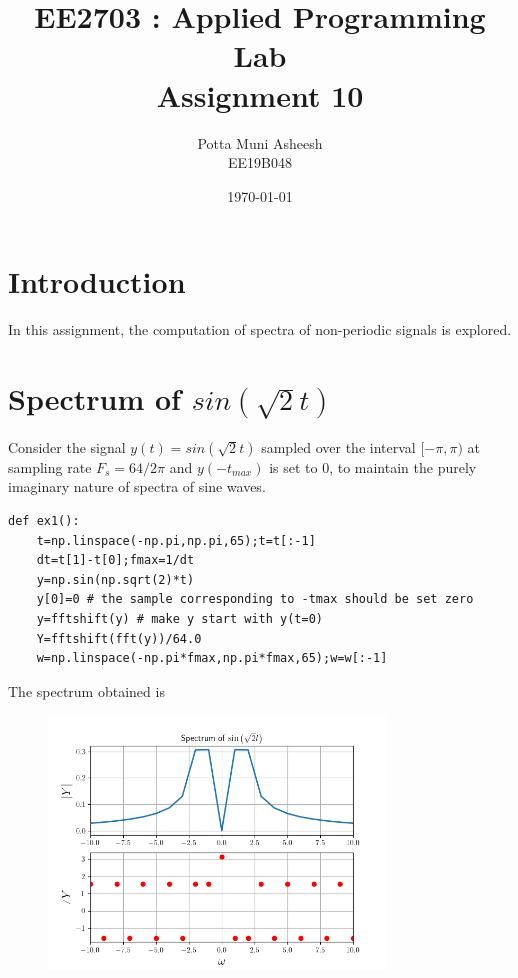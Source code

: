 \documentclass[12pt, a4paper]{article}
\title{\textbf{EE2703 : Applied Programming Lab \\ Assignment 10}} %
\author{Potta Muni Asheesh \\ EE19B048} %
\date{\today} %
\begin{document}
	
		
\maketitle %

\section{Introduction}

In this assignment, the computation of spectra of non-periodic signals is explored.

\section{Spectrum of $sin(\sqrt{2}t)$}

Consider the signal $y(t) = sin(\sqrt{2}t)$ sampled over the interval $[-\pi, \pi)$ at sampling rate $F_s = 64/2\pi$ and $y(-t_{max})$ is set to 0, to maintain the purely imaginary nature of spectra of sine waves.

\begin{lstlisting}
def ex1():
    t=np.linspace(-np.pi,np.pi,65);t=t[:-1]
    dt=t[1]-t[0];fmax=1/dt
    y=np.sin(np.sqrt(2)*t)
    y[0]=0 # the sample corresponding to -tmax should be set zero
    y=fftshift(y) # make y start with y(t=0)
    Y=fftshift(fft(y))/64.0
    w=np.linspace(-np.pi*fmax,np.pi*fmax,65);w=w[:-1]
\end{lstlisting}

The spectrum obtained is

\begin{figure}[H]
\centering
\includegraphics[width=0.8\textwidth]{ex1.png}
\end{figure}
\end{document}
